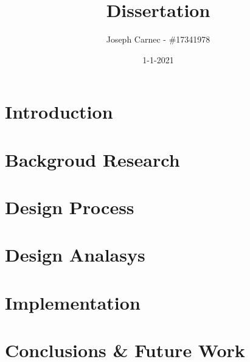 \documentclass[12pt]{article}
\title{Dissertation}
\author{Joseph Carnec - \#17341978}
\date{1-1-2021}
\begin{document}
\maketitle
\section{Introduction}
\section{Backgroud Research}
\section{Design Process}
\section{Design Analasys}
\section{Implementation}
\section{Conclusions \& Future Work}
\end{document}
